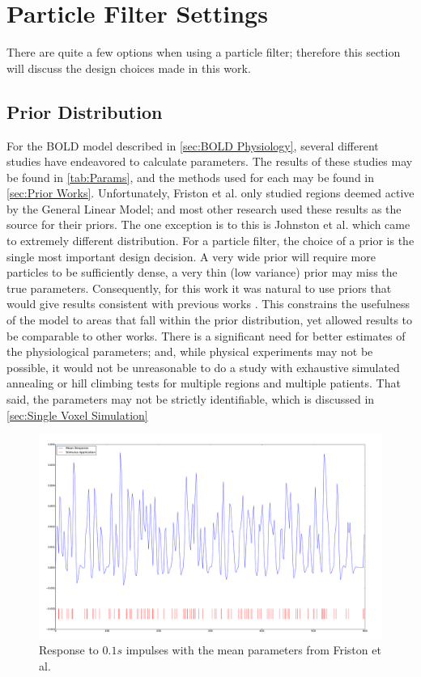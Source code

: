 \section{Particle Filter Settings}
There are quite a few options when using a particle filter; therefore this
section will discuss the design choices made in this work.

\subsection{Prior Distribution}
\label{sec:PriorDist}
For the \ac{BOLD} model described in \autoref{sec:BOLD Physiology}, several
different studies have endeavored to calculate parameters. The results
of these studies may be found in \autoref{tab:Params}, and the methods
used for each may be found in \autoref{sec:Prior Works}. Unfortunately,
Friston et al. \cite{Friston2002b} only studied regions deemed active 
by the General
Linear Model; and most other research used these results as
the source for their priors.
The one exception is to this is Johnston et al. \cite{Johnston2007} 
which came to extremely different distribution. For a particle filter, 
the choice of a prior is
the single most important design decision. A very wide prior will require
more particles to be sufficiently dense, a very thin (low variance) prior may miss
the true parameters. Consequently, for this work it was natural
to use priors that would give results consistent with previous works
\cite{Friston2002b}. This constrains the usefulness of the model to
areas that fall within the prior distribution, yet allowed results
to be comparable to other works. There is a significant need for better
estimates of the physiological parameters; and, while physical experiments
may not be possible, it would not be unreasonable to do a study with
exhaustive simulated annealing or hill climbing tests for multiple
regions and multiple patients. That said, the parameters may  not be
strictly identifiable, which is discussed in
\autoref{sec:Single Voxel Simulation}

\begin{figure}
\centering
\includegraphics[trim=6cm 2cm 6cm 2cm,width=15cm]{images/mean_response}
\caption{Response to $0.1s$ impulses with the mean parameters from 
Friston et al. \cite{Friston2000b}}
\label{fig:MeanResponseF}
\end{figure}

